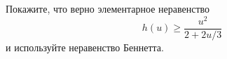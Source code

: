 \begin{ordre} 
Покажите, что верно элементарное неравенство 
\begin{equation*}
h(u)\geq \frac{u^2}{2+2u/3}
\end{equation*}
и используйте неравенство Беннетта.

\begin{comment}
Отметим, что в случае схемы Пуассона, т.е. если рассмотреть последовательность $\xi_1,\dots,\xi_n$ с распределнием Бернулли с вероятностью успеха $\lambda/n$,   оценка в асимптотике по $n$ принимает вид, аналогичный  неравенству больших уклонений.
\end{comment}

\end{ordre}


